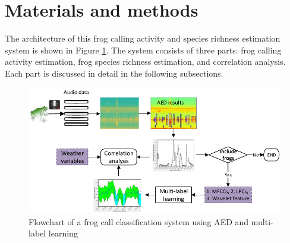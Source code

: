   





\section{Materials and methods}
The architecture of this frog calling activity and species richness estimation system is shown in Figure \ref{fig:Ch7_flowchart}. The system consists of three parts: frog calling activity estimation, frog species richness estimation, and correlation analysis. Each part is discussed in detail in the following subsections.

\begin{figure}[htb!]
\centering
\includegraphics[width=\textwidth]{image/Ch7/flowchart.pdf}
\caption{Flowchart of a frog call classification system using AED and multi-label learning}
\label{fig:Ch7_flowchart}
\end{figure}


